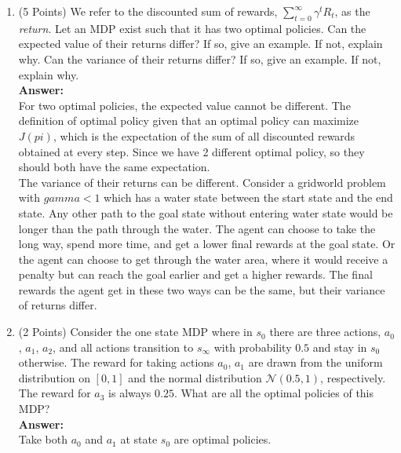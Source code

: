 \documentclass[]{article}
\begin{document}
\begin{enumerate}
    \item (5 Points) We refer to the discounted sum of rewards, $\sum_{t=0}^\infty \gamma^t R_t$, as the \emph{return}. Let an MDP exist such that it has two optimal policies. Can the expected value of their returns differ? If so, give an example. If not, explain why. Can the variance of their returns differ? If so, give an example. If not, explain why.\\
    \textbf{Answer:}\\
    For two optimal policies, the expected value cannot be different. The definition of optimal policy given that an optimal policy can maximize $J(pi)$, which is the expectation of the sum of all discounted rewards obtained at every step. Since we have 2 different optimal policy, so they should both have the same expectation. \\
    The variance of their returns can be different. Consider a gridworld problem with $gamma<1$ which has a water state between the start state and the end state. Any other path to the goal state without entering water state would be longer than the path through the water. The agent can choose to take the long way, spend more time, and get a lower final rewards at the goal state. Or the agent can choose to get through the water area, where it would receive a penalty but can reach the goal earlier and get a higher rewards. The final rewards the agent get in these two ways can be the same, but their variance of returns differ.
    
    \item (2 Points) Consider the one state MDP where in $s_0$ there are three actions, $a_0$, $a_1$, $a_2$, and all actions transition to $s_\infty$ with probability $0.5$ and stay in $s_0$ otherwise. The reward for taking actions $a_0$, $a_1$ are drawn from the uniform distribution on $[0,1]$ and the normal distribution $\mathcal{N}(0.5,1)$, respectively. The reward for $a_3$ is always $0.25$. What are all the optimal policies of this MDP? \\
    \textbf{Answer:}\\
    Take both $a_0$ and $a_1$ at state $s_0$ are optimal policies.
    

\end{enumerate}
\end{document}
